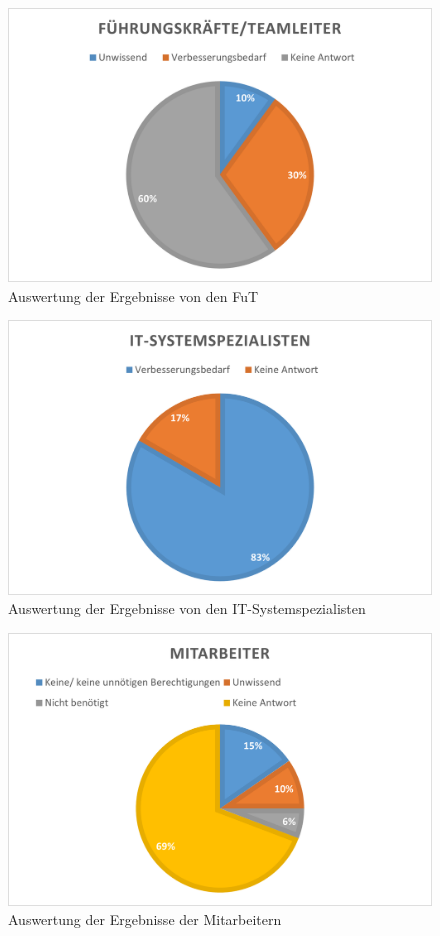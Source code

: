 \begin{figure}[h!]
 \centering
 \includegraphics[width=1\textwidth]{gfx/Picture/FuT.PNG}
 \caption{Auswertung der Ergebnisse von den FuT}
 \label{fig:Fut}
\end{figure}
\begin{figure}[h!]
 \centering
 \includegraphics[width=1\textwidth]{gfx/Picture/IT.PNG}
 \caption{Auswertung der Ergebnisse von den IT-Systemspezialisten}
 \label{fig:IT}
\end{figure}
\begin{figure}[h!]
 \centering
 \includegraphics[width=1\textwidth]{gfx/Picture/Mitarbeiter.PNG}
 \caption{Auswertung der Ergebnisse der Mitarbeitern}
 \label{fig:Mit}
\end{figure}
